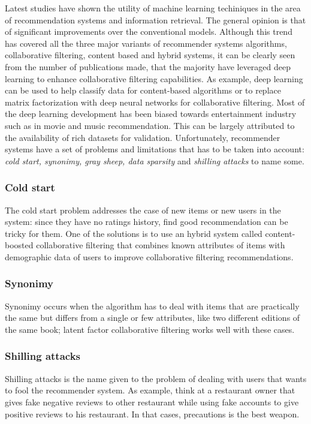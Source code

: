 \documentclass[b5paper,10pt,twoside,cucitura]{toptesi}
\begin{document}
Latest studies   \citep{RS-ML1}  \citep{RS-ML2} have shown the utility of machine learning techiniques in the area of recommendation systems and information retrieval. The general opinion is that of significant improvements over the conventional models. Although this trend has covered all the three major variants of recommender systems algorithms, collaborative filtering, content based and hybrid systems, it can be clearly seen from the number of publications made, that the majority have leveraged deep learning to enhance collaborative filtering capabilities. As example, deep learning can be used to help classify data for content-based algorithms or to replace matrix factorization with deep neural networks for collaborative filtering. 
Most of the deep learning development has been biased towards entertainment industry such as in movie and music recommendation. This can be largely attributed to the availability of rich datasets for validation. 
Unfortunately, recommender systems have a set of problems and limitations   \citep{RS-stateofart} that has to be taken into account: \textit{cold start, synonimy, gray sheep, data sparsity} and \textit{shilling attacks} to name some. 

\subsubsection{Cold start} The cold start problem addresses the case of new items or new users in the system: since they have no ratings history, find good recommendation can be tricky for them. One of the solutions is to use an hybrid system called content-boosted collaborative filtering that combines known attributes of items with demographic data  of users to improve collaborative filtering recommendations.

\subsubsection{Synonimy} Synonimy occurs when the algorithm has to deal with items that are practically the same but differs from a single or few attributes, like two different editions of the same book; latent factor collaborative filtering works well with these cases.

\subsubsection{Shilling attacks} Shilling attacks is the name given to the problem of dealing with users that wants to fool the recommender system. As example, think at a restaurant owner that gives fake negative reviews to other restaurant while using fake accounts to give positive reviews to his restaurant. In that cases, precautions is the best weapon.
\end{document}
